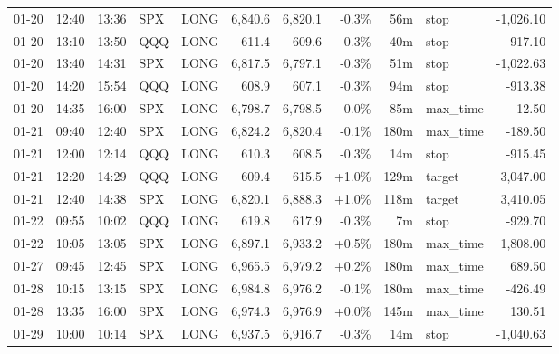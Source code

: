 \documentclass[11pt,a4paper,twoside]{article}
\begin{document}
\begin{center}
\begin{longtable}{>{\color{txtmain}}l l l l l r r r r >{\color{txtmain}}l r}
01-20 & 12:40 & 13:36 & SPX & LONG & 6,840.6 & 6,820.1 & \textcolor{lossred}{-0.3\%} & 56m & stop & \textcolor{lossred}{-1,026.10} \\
01-20 & 13:10 & 13:50 & QQQ & LONG & 611.4 & 609.6 & \textcolor{lossred}{-0.3\%} & 40m & stop & \textcolor{lossred}{-917.10} \\
01-20 & 13:40 & 14:31 & SPX & LONG & 6,817.5 & 6,797.1 & \textcolor{lossred}{-0.3\%} & 51m & stop & \textcolor{lossred}{-1,022.63} \\
01-20 & 14:20 & 15:54 & QQQ & LONG & 608.9 & 607.1 & \textcolor{lossred}{-0.3\%} & 94m & stop & \textcolor{lossred}{-913.38} \\
01-20 & 14:35 & 16:00 & SPX & LONG & 6,798.7 & 6,798.5 & \textcolor{lossred}{-0.0\%} & 85m & max\_time & \textcolor{lossred}{-12.50} \\
01-21 & 09:40 & 12:40 & SPX & LONG & 6,824.2 & 6,820.4 & \textcolor{lossred}{-0.1\%} & 180m & max\_time & \textcolor{lossred}{-189.50} \\
01-21 & 12:00 & 12:14 & QQQ & LONG & 610.3 & 608.5 & \textcolor{lossred}{-0.3\%} & 14m & stop & \textcolor{lossred}{-915.45} \\
01-21 & 12:20 & 14:29 & QQQ & LONG & 609.4 & 615.5 & \textcolor{wingreen}{+1.0\%} & 129m & target & \textcolor{wingreen}{3,047.00} \\
01-21 & 12:40 & 14:38 & SPX & LONG & 6,820.1 & 6,888.3 & \textcolor{wingreen}{+1.0\%} & 118m & target & \textcolor{wingreen}{3,410.05} \\
01-22 & 09:55 & 10:02 & QQQ & LONG & 619.8 & 617.9 & \textcolor{lossred}{-0.3\%} & 7m & stop & \textcolor{lossred}{-929.70} \\
01-22 & 10:05 & 13:05 & SPX & LONG & 6,897.1 & 6,933.2 & \textcolor{wingreen}{+0.5\%} & 180m & max\_time & \textcolor{wingreen}{1,808.00} \\
01-27 & 09:45 & 12:45 & SPX & LONG & 6,965.5 & 6,979.2 & \textcolor{wingreen}{+0.2\%} & 180m & max\_time & \textcolor{wingreen}{689.50} \\
01-28 & 10:15 & 13:15 & SPX & LONG & 6,984.8 & 6,976.2 & \textcolor{lossred}{-0.1\%} & 180m & max\_time & \textcolor{lossred}{-426.49} \\
01-28 & 13:35 & 16:00 & SPX & LONG & 6,974.3 & 6,976.9 & \textcolor{wingreen}{+0.0\%} & 145m & max\_time & \textcolor{wingreen}{130.51} \\
01-29 & 10:00 & 10:14 & SPX & LONG & 6,937.5 & 6,916.7 & \textcolor{lossred}{-0.3\%} & 14m & stop & \textcolor{lossred}{-1,040.63} \\

\end{longtable}
\end{center}
\end{document}
